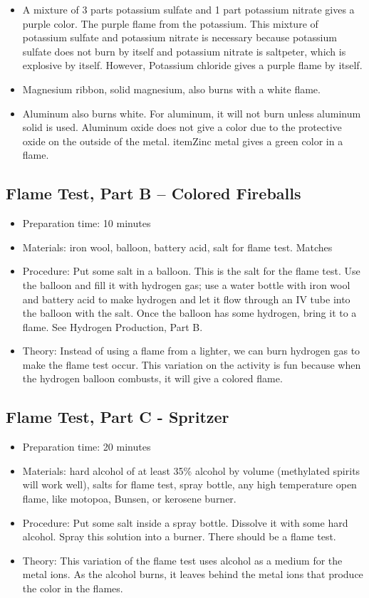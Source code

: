 \begin{itemize}
{\begin{itemize}
\item{A mixture of 3 parts potassium sulfate and 1 part potassium nitrate gives a purple color. The purple flame from the potassium. This mixture of potassium sulfate and potassium nitrate is necessary because potassium sulfate does not burn by itself and potassium nitrate is saltpeter, which is explosive by itself. However, Potassium chloride gives a purple flame by itself.}
\item{Magnesium ribbon, solid magnesium, also burns with a white flame.}
\item{Aluminum also burns white. For aluminum, it will not burn unless aluminum solid is used. Aluminum oxide does not give a color due to the protective oxide on the outside of the metal.}
item{Zinc metal gives a green color in a flame.}
\end{itemize}
} %
\end{itemize}

\subsection{Flame Test, Part B – Colored Fireballs}
\begin{itemize}
\item{Preparation time: 10 minutes}
\item{Materials: iron wool, balloon, battery acid, salt for flame test. Matches}
\item{Procedure: Put some salt in a balloon. This is the salt for the flame test. Use the balloon and fill it with hydrogen gas; use a water bottle with iron wool and battery acid to make hydrogen and let it flow through an IV tube into the balloon with the salt. Once the balloon has some hydrogen, bring it to a flame. See Hydrogen Production, Part B.}
\item{Theory: Instead of using a flame from a lighter, we can burn hydrogen gas to make the flame test occur. This variation on the activity is fun because when the hydrogen balloon combusts, it will give a colored flame. }
\end{itemize}

\subsection{Flame Test, Part C - Spritzer}
\begin{itemize}
\item{Preparation time: 20 minutes}
\item{Materials: hard alcohol of at least 35\% alcohol by volume (methylated spirits will work well), salts for flame test, spray bottle, any high temperature open flame, like motopoa, Bunsen, or kerosene burner.}
\item{Procedure: Put some salt inside a spray bottle. Dissolve it with some hard alcohol. Spray this solution into a burner. There should be a flame test.}
\item{Theory: This variation of the flame test uses alcohol as a medium for the metal ions. As the alcohol burns, it leaves behind the metal ions that produce the color in the flames. }
\end{itemize}

